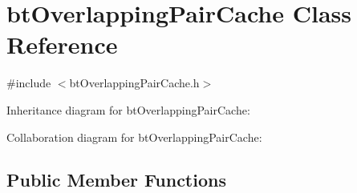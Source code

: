 \hypertarget{classbt_overlapping_pair_cache}{\section{bt\+Overlapping\+Pair\+Cache Class Reference}
\label{classbt_overlapping_pair_cache}
}


{\ttfamily \#include $<$bt\+Overlapping\+Pair\+Cache.\+h$>$}



Inheritance diagram for bt\+Overlapping\+Pair\+Cache\+:


Collaboration diagram for bt\+Overlapping\+Pair\+Cache\+:
\subsection*{Public Member Functions}
